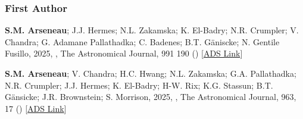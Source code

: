 \documentclass[12pt,letterpaper]{article}
\begin{document}
\subsubsection{First Author}
\begin{list}{}{\cvlist}
  \item[{\color{numcolor}\scriptsize2}] \textbf{S.M. Arseneau}; J.J. Hermes; N.L. Zakamska; K. El-Badry; N.R. Crumpler; V. Chandra; G. Adamane Pallathadka; C. Badenes; B.T. G\"aniscke; N. Gentile Fusillo, 2025, , The Astronomical Journal, 991 190 () [\href{https://ui.adsabs.harvard.edu/abs/2025arXiv250804775A}{ADS Link}]
  \item[{\color{numcolor}\scriptsize1}] \textbf{S.M. Arseneau}; V. Chandra; H.C. Hwang; N.L. Zakamska; G.A. Pallathadka; N.R. Crumpler; J.J. Hermes; K. El-Badry; H-W. Rix; K.G. Stassun; B.T. G\"ansicke; J.R. Brownstein; S. Morrison, 2025, , The Astronomical Journal, 963, 17 () [\href{https://ui.adsabs.harvard.edu/abs/2024ApJ...963...17A/abstract}{ADS Link}]
\end{list}
\end{document}
